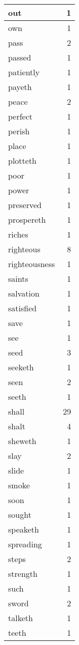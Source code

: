 \begin{center}
\begin{longtable}{l|r}
out & 1 \\ \hline
own & 1 \\ \hline
pass & 2 \\ \hline
passed & 1 \\ \hline
patiently & 1 \\ \hline
payeth & 1 \\ \hline
peace & 2 \\ \hline
perfect & 1 \\ \hline
perish & 1 \\ \hline
place & 1 \\ \hline
plotteth & 1 \\ \hline
poor & 1 \\ \hline
power & 1 \\ \hline
preserved & 1 \\ \hline
prospereth & 1 \\ \hline
riches & 1 \\ \hline
righteous & 8 \\ \hline
righteousness & 1 \\ \hline
saints & 1 \\ \hline
salvation & 1 \\ \hline
satisfied & 1 \\ \hline
save & 1 \\ \hline
see & 1 \\ \hline
seed & 3 \\ \hline
seeketh & 1 \\ \hline
seen & 2 \\ \hline
seeth & 1 \\ \hline
shall & 29 \\ \hline
shalt & 4 \\ \hline
sheweth & 1 \\ \hline
slay & 2 \\ \hline
slide & 1 \\ \hline
smoke & 1 \\ \hline
soon & 1 \\ \hline
sought & 1 \\ \hline
speaketh & 1 \\ \hline
spreading & 1 \\ \hline
steps & 2 \\ \hline
strength & 1 \\ \hline
such & 1 \\ \hline
sword & 2 \\ \hline
talketh & 1 \\ \hline
teeth & 1 \\ \hline

\end{longtable}
\end{center}
